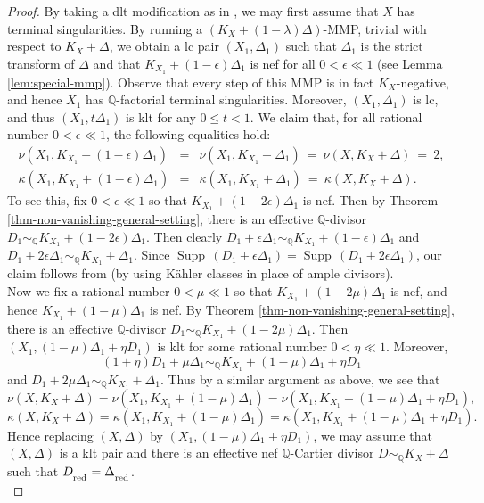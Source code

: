\documentclass[12pt]{amsart}
\newcommand{\mbQ}{\mathbb{Q}}
\newcommand{\<}{\leq}
\def\eps{\epsilon}
\newcommand{\D}{\Delta}
\theoremstyle{remark}
\theoremstyle{definition}
\theoremstyle{definition}
\numberwithin{equation}{section}
\theoremstyle{definition}
\theoremstyle{definition}
\def\Supp{\operatorname{Supp}}
\def\red{\operatorname{\textsubscript{\rm red}}}
\begin{document}
\begin{proof} 
By taking a dlt modification as in \cite[Corollary 5.3]{DasOu2022}, 
we may first assume that $X$ has terminal singularities. 
By running a $(K_X+(1-\lambda)\Delta)$-MMP, trivial with respect to $K_X+\Delta$, we obtain a lc pair $(X_1,\D_1)$ such that $\D_1$ is the strict transform of $\D$ and that  $K_{X_1}+(1-\epsilon)\Delta_1$ is nef for all $0<\epsilon \ll 1$ (see Lemma  \ref{lem:special-mmp}). 
Observe that every step of this MMP is in fact $K_X$-negative, and hence  $X_1$ has $\mbQ$-factorial terminal singularities. Moreover, $(X_1,\Delta_1)$ is lc, and thus $(X_1, t\Delta_1)$ is klt for any $0\<t<1$. 
We claim that, for all rational number $0<\epsilon\ll 1$, the following equalities hold:
\begin{eqnarray*}
   \nu(X_1, K_{X_1}+(1-\epsilon)\Delta_1) &=& \nu(X_1, K_{X_1}+\Delta_1)\ = \ \nu(X, K_X+\Delta) \ =\ 2, \\
  \kappa (X_1, K_{X_1}+(1-\epsilon)\Delta_1) &=& \kappa (X_1, K_{X_1}+\Delta_1) \  = \  \kappa(X, K_X+\Delta). 
\end{eqnarray*}
To see this, fix $0<\eps\ll 1$ so that $K_{X_1}+(1-2\eps)\Delta_1$ is nef. 
Then by Theorem \ref{thm-non-vanishing-general-setting}, 
there is an effective $\mbQ$-divisor $D_1\sim_{\mbQ} K_{X_1}+(1-2\eps)\Delta_1$. 
Then clearly $D_1 +\eps\Delta_1\sim_{\mbQ} K_{X_1}+(1-\eps)\Delta_1$ and $D_1+2\eps \Delta_1\sim_{\mbQ} K_{X_1}+\Delta_1$. 
Since $\Supp\, (D_1+\eps\Delta_1) = \Supp\, (D_1+2\eps \Delta_1)$, our claim follows from \cite[Lemma 11.3.3]{Kol92} (by using K\"ahler classes in place of ample divisors).\\

Now we fix a rational number $0<\mu\ll 1$ so that $K_{X_1}+(1-2\mu)\Delta_1$ is nef, and hence $K_{X_1}+(1-\mu)\Delta_1$ is nef. 
By Theorem \ref{thm-non-vanishing-general-setting}, there is an effective $\mbQ$-divisor $D_1\sim_{\mbQ} K_{X_1}+(1-2\mu)\Delta_1$. 
Then $(X_1, (1-\mu)\Delta_1+\eta D_1)$ is klt for some rational number $0<\eta\ll 1$. 
Moreover, 
\[(1+\eta)D_1+\mu\Delta_1\sim_{\mbQ} K_{X_1}+(1-\mu)\Delta_1+\eta D_1\] 
 and $D_1+2\mu\Delta_1\sim_{\mbQ} K_{X_1}+\Delta_1$. 
Thus by a similar argument as above, we see that 
\[\nu(X, K_X+\Delta)=\nu(X_1, K_{X_1}+(1-\mu)\Delta_1)=\nu(X_1, K_{X_1}+(1-\mu)\Delta_1+\eta D_1), \] 
\[\kappa(X, K_X+\Delta)=\kappa(X_1, K_{X_1}+(1-\mu)\Delta_1)=\kappa(X_1, K_{X_1}+(1-\mu)\Delta_1+\eta D_1).\]
Hence replacing $(X, \Delta)$ by $(X_1, (1-\mu)\Delta_1+\eta D_1)$,  we may assume that  $(X, \Delta)$ is a klt pair and there is an effective nef $\mbQ$-Cartier divisor $D\sim_{\mbQ} K_X+\Delta$ such that $D_{\red}=\Delta_{\red}$. 
\\





\end{proof}
\end{document}
